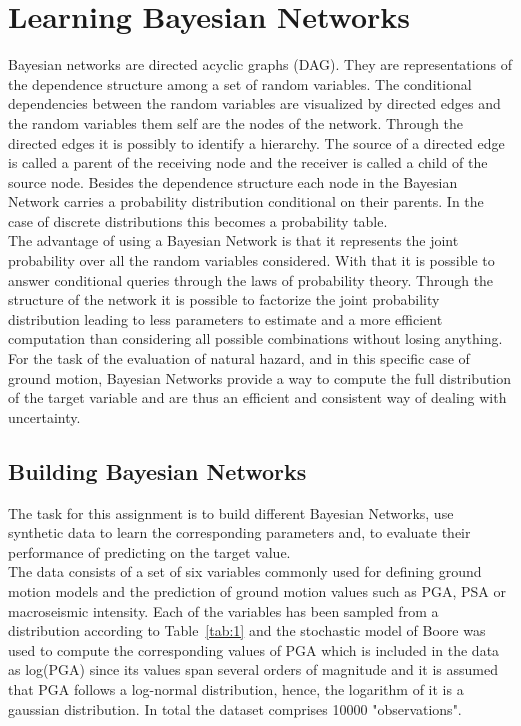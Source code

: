 
\chapter{Learning Bayesian Networks} %

\label{Chapter2} %

Bayesian networks are directed acyclic graphs (DAG). They are representations of the dependence structure among a set of random variables. The conditional dependencies between the random variables are visualized by directed edges and the random variables them self are the nodes of the network. Through the directed edges it is possibly to identify a hierarchy. The source of a directed edge is called a parent of the receiving node and the receiver is called a child of the source node. Besides the dependence structure each node in the Bayesian Network carries a probability distribution conditional on their parents. In the case of discrete distributions this becomes a probability table.\\
The advantage of using a Bayesian Network is that it represents the joint probability over all the random variables considered. With that it is possible to answer conditional queries through the laws of probability theory. Through the structure of the network it is possible to factorize the joint probability distribution leading to less parameters to estimate and a more efficient computation than considering all possible combinations without losing anything. For the task of the evaluation of natural hazard, and in this specific case of ground motion, Bayesian Networks provide a way to compute the full distribution of the target variable and are thus an efficient and consistent way of dealing with uncertainty. 
\newpage


\section{Building Bayesian Networks}
The task for this assignment is to build different Bayesian Networks, use synthetic data to learn the corresponding parameters and, to evaluate their performance of predicting on the target value.\\
The data consists of a set of six variables commonly used for defining ground motion models and the prediction of ground motion values such as PGA, PSA or macroseismic intensity. Each of the variables has been sampled from a distribution according to Table~\ref{tab:1} and the stochastic model of Boore     \citep{boore2003} was used to compute the corresponding values of PGA which is included in the data as log(PGA) since its values span several orders of magnitude and it is assumed that PGA follows a log-normal distribution, hence, the logarithm of it is a gaussian distribution. In total the dataset comprises 10000 "observations".
\vspace{1.5cm}


